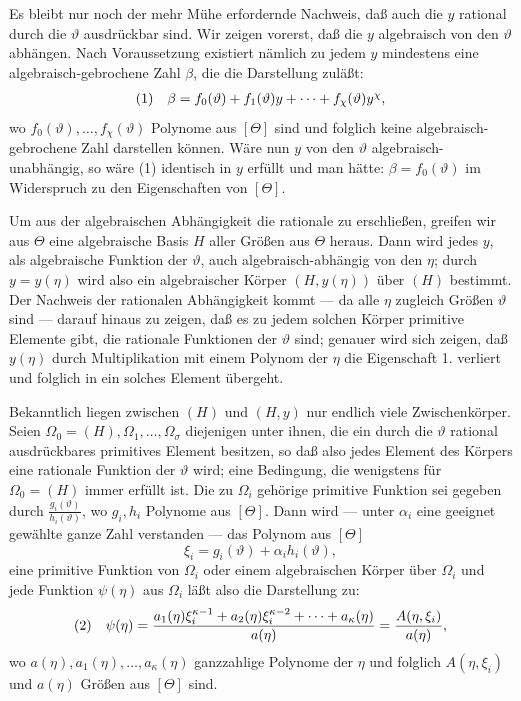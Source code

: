 Es bleibt nur noch der mehr Mühe erfordernde Nachweis, daß auch die $y$ rational
durch die $\vartheta$ ausdrückbar sind. Wir zeigen vorerst, daß die $y$
algebraisch von den $\vartheta$ abhängen. Nach Voraussetzung existiert nämlich
zu jedem $y$ mindestens eine algebraisch-gebrochene Zahl $\beta$, die die
Darstellung zuläßt:
\[
\begin{array}{@{}l@{\quad}c@{}}
(1)& \beta=f_0(\vartheta)+f_1(\vartheta)y+\cdots+f_\chi(\vartheta)y^\chi,
\end{array}
\]
wo $f_0(\vartheta),\ldots,f_\chi(\vartheta)$ Polynome aus $[\Theta]$ sind und
folglich keine algebraisch-gebrochene Zahl darstellen können. Wäre nun $y$ von
den $\vartheta$ algebraisch-unabhängig, so wäre (1) identisch in $y$ erfüllt und
man hätte: $\beta=f_0(\vartheta)$ im Widerspruch zu den Eigenschaften von
$[\Theta]$.

Um aus der algebraischen Abhängigkeit die rationale zu erschließen, greifen wir
aus $\Theta$ eine algebraische Basis $H$ aller Größen aus $\Theta$ heraus. Dann
wird jedes $y$, als algebraische Funktion der $\vartheta$, auch
algebraisch-abhängig von den $\eta$; durch $y=y(\eta)$ wird also ein
algebraischer Körper $(H,y(\eta))$ über $(H)$ bestimmt. Der Nachweis der
rationalen Abhängigkeit kommt --- da alle $\eta$ zugleich Größen $\vartheta$
sind --- darauf hinaus zu zeigen, daß es zu jedem solchen Körper primitive
Elemente gibt, die rationale Funktionen der $\vartheta$ sind; genauer wird sich
zeigen, daß $y(\eta)$ durch Multiplikation mit einem Polynom der $\eta$ die
Eigenschaft 1. verliert und folglich in ein solches Element übergeht.

Bekanntlich liegen zwischen $(H)$ und $(H,y)$ nur endlich viele Zwischenkörper.
Seien $\Omega_0=(H),\Omega_1,\ldots,\Omega_\sigma$ diejenigen unter ihnen, die
ein durch die $\vartheta$ rational ausdrückbares primitives Element besitzen, so
daß also jedes Element des Körpers eine rationale Funktion der $\vartheta$ wird;
eine Bedingung, die wenigstens für $\Omega_0=(H)$ immer erfüllt ist. Die zu
$\Omega_i$ gehörige primitive Funktion sei gegeben durch
$\frac{g_i(\vartheta)}{h_i(\vartheta)}$, wo $g_i,h_i$ Polynome aus $[\Theta]$.
Dann wird --- unter $\alpha_i$ eine geeignet gewählte ganze Zahl verstanden ---
das Polynom aus $[\Theta]$
\[
 \xi_i=g_i(\vartheta)+\alpha_i h_i(\vartheta),
\]
eine primitive Funktion von $\Omega_i$ oder einem algebraischen Körper über
$\Omega_i$ und jede Funktion $\psi(\eta)$ aus
$\Omega_i$ läßt also die Darstellung zu:
\[
\begin{array}{@{}l@{\quad}l@{}}
(2)& \displaystyle \psi(\eta)=
\frac{a_1(\eta)\xi_i^{\kappa-1}+a_2(\eta)\xi_i^{\kappa-2}+\cdots+a_\kappa(\eta)}
     {a(\eta)}
=\frac{A(\eta,\xi_i)}{a(\eta)},
\end{array}
\]
wo $a(\eta),a_1(\eta),\ldots,a_\kappa(\eta)$ ganzzahlige Polynome der $\eta$
und folglich $A(\eta,\xi_i)$ und $a(\eta)$ Größen aus $[\Theta]$ sind.

